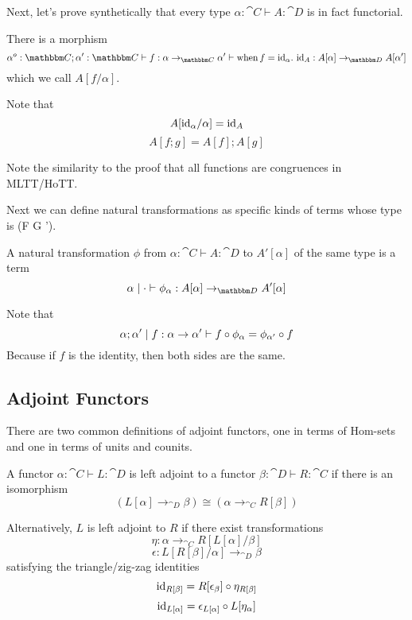 \documentclass{article}
\begin{document}
Next, let's prove synthetically that every type $\alpha : \cat C
\vdash A : \cat D$ is in fact functorial.
\begin{definition}
  There is a morphism
  \[ \alpha^o:\cat C;\alpha':\cat C \vdash f : \alpha \to_{\cat C} \alpha' \vdash
  \when f = \id_{\alpha}.~ \id_{A} : A[\alpha] \to_{\cat D} A[\alpha']
  \]
  which we call $A[f/\alpha]$.

  Note that
  \[ A[\text{id}_\alpha/\alpha] = \text{id}_{A} \]
  \[ A[f;g] = A[f];A[g] \]
\end{definition}
Note the similarity to the proof that all functions are congruences in
MLTT/HoTT.

Next we can define natural transformations as specific kinds of
terms whose type is (F \alpha \to G \alpha').
\begin{definition}
  A natural transformation $\phi$ from $\alpha : \cat C \vdash A : \cat D$ to
  $A'[\alpha]$ of the same type is a term
  \[ \alpha\pipe \cdot \vdash \phi_\alpha : A[\alpha] \to_{\cat D} A'[\alpha] \]

  Note that
  \[ \alpha;\alpha' \mathrel{|} f : \alpha \to \alpha' \vdash
  f \circ \phi_{\alpha} = \phi_{\alpha'} \circ f
  \]
  Because if $f$ is the identity, then both sides are the same.
\end{definition}

\subsection{Adjoint Functors}

There are two common definitions of adjoint functors, one in terms of
Hom-sets and one in terms of units and counits.

\begin{definition}
  A functor $\alpha : \cat C \vdash L : \cat D$ is left adjoint to a
  functor $\beta : \cat D \vdash R : \cat C$ if there is an isomorphism
  \[ (L[\alpha] \to_{\cat D} \beta) \cong (\alpha \to_{\cat C} R[\beta]) \]

  Alternatively, $L$ is left adjoint to $R$ if there exist
  transformations
  \[ \eta : \alpha \to_{\cat C} R[L[\alpha]/\beta] \] %
  \[ \epsilon : L[R[\beta]/\alpha] \to_{\cat D} \beta  \] %
  satisfying the triangle/zig-zag identities
  \[ \text{id}_{R[\beta]} = R[\epsilon_{\beta}] \circ \eta_{R[\beta]} \]
  \[ \text{id}_{L[\alpha]} = \epsilon_{L[\alpha]} \circ L[\eta_{\alpha}] \]
\end{definition}
\end{document}
